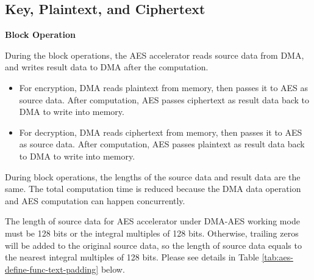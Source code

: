 \documentclass[main\_\_EN.tex]{subfiles}
\begin{document}

\subsection{Key, Plaintext, and Ciphertext}

\textbf{Block Operation}

During the block operations, the AES accelerator reads source data from DMA, and writes result data to DMA after the computation.

\begin{itemize}
    \item For encryption, DMA reads plaintext from memory, then passes it to AES as source data. After computation, AES passes ciphertext as result data  back to DMA to write into memory.
    \item For decryption, DMA reads ciphertext from memory, then passes it to AES as source data. After computation, AES passes plaintext as result data back to DMA to write into memory. 
\end{itemize}

During block operations, the lengths of the source data and result data are the same. The total computation time is reduced because the DMA data operation and AES computation can happen concurrently.

\label{api:testpadding}The length of source data for AES accelerator under DMA-AES working mode must be 128 bits or the integral multiples of 128 bits. Otherwise, trailing zeros will be added to the original source data, so the length of source data equals to the nearest integral multiples of 128 bits. Please see details in Table \ref{tab:aes-define-func-text-padding} below.

\end{document}
